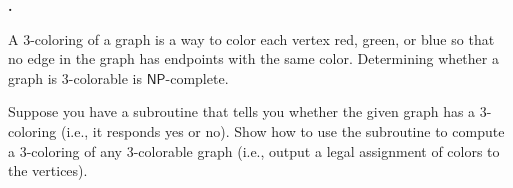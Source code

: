 \documentclass[letterpaper,11pt]{article}
\newcommand{\cc}[1]{\ensuremath{\textsf{#1}}\xspace}
\newcommand{\NP}{\cc{NP}}
\newcounter{problem}
\newenvironment{problem}%
{%
	\stepcounter{problem}%
	\textbf{\theproblem.}
	\large
}{\\}%
\begin{document}

\begin{problem}
A 3-coloring of a graph is a way to color each vertex red, green, or blue so that no edge in the graph has endpoints with the same color. Determining whether a graph is 3-colorable is \NP-complete.

Suppose you have a subroutine that tells you whether the given graph has a 3-coloring (i.e., it responds {\sc yes} or {\sc no}). Show how to use the subroutine to compute a 3-coloring of any 3-colorable graph (i.e., output a legal assignment of colors to the vertices).
\end{problem}
\end{document}
